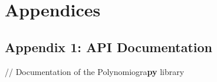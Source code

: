 \chapter*{Appendices}

\section*{Appendix 1: API Documentation}

// Documentation of the Polynomiogra\textbf{py} library

\label{Appendix 1}